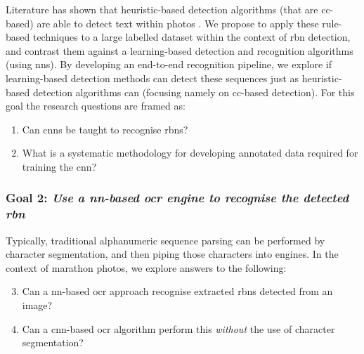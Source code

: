Literature has shown that heuristic-based detection algorithms (that are \gls{cc}-based) are able to detect text within photos \citep{Li:2012wd, Chen:2011ul, Eichner:2008dw}. We propose to apply these rule-based techniques to a large labelled dataset within the context of \gls{rbn} detection, and contrast them against a learning-based detection and recognition algorithms (using \glspl{nn}). By developing an end-to-end recognition pipeline, we explore if learning-based detection methods can detect these sequences just as heuristic-based detection algorithms can (focusing namely on \gls{cc}-based detection).
For this goal the research questions are framed as:
\begin{enumerate}[label=\bfseries~RQ\arabic*), leftmargin=2cm, rightmargin=1.5cm]
  \item\label{rq:1} Can \glspl{cnn} be taught to recognise \glspl{rbn}?
  \item\label{rq:2} What is a systematic methodology for developing annotated data required for training the \gls{cnn}?
\end{enumerate}

\subsubsection*{Goal 2: \itshape Use a \gls{nn}-based \gls{ocr} engine to recognise the detected \gls{rbn}}

Typically, traditional alphanumeric sequence parsing can be performed by character segmentation, and then piping those characters into  engines.
In the context of marathon photos, we explore answers to the following:
\begin{enumerate}[label=\bfseries~RQ\arabic*), leftmargin=2cm, rightmargin=1.5cm]
  \setcounter{enumi}{2}
  \item\label{rq:3} Can a \gls{nn}-based \gls{ocr} approach recognise extracted \glspl{rbn} detected from an image?
  \item\label{rq:4} Can a \gls{cnn}-based \gls{ocr} algorithm perform this \textit{without} the use of character segmentation?
\end{enumerate}

